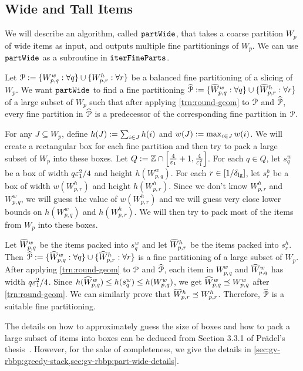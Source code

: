 \subsection{Wide and Tall Items}

We will describe an algorithm, called $\operatorname{\mathtt{partWide}}$,
that takes a coarse partition $W_p$ of wide items as input,
and outputs multiple fine partitionings of $W_p$.
We can use $\operatorname{\mathtt{partWide}}$ as a subroutine in $\operatorname{\mathtt{iterFineParts}}$.

Let $\mathcal{P} := \{W_{p,q}^w: \forall q\} \cup \{W_{p,r}^h: \forall r\}$ be
a balanced fine partitioning of a slicing of $W_p$.
We want $\operatorname{\mathtt{partWide}}$ to find a fine partitioning
$\widehat{\mathcal{P}} := \{\widehat{W}_{p,q}^w: \forall q\} \cup \{\widehat{W}_{p,r}^h: \forall r\}$
of a large subset of $W_p$ such that
after applying \cref{trn:round-geom} to $\mathcal{P}$ and $\widehat{\mathcal{P}}$,
every fine partition in $\widehat{\mathcal{P}}$ is a predecessor of
the corresponding fine partition in $\mathcal{P}$.

For any $J \subseteq W_p$, define
$h(J) := \sum_{i \in J} h(i)$ and $w(J) := \max_{i \in J} w(i)$.
We will create a rectangular box for each fine partition
and then try to pack a large subset of $W_p$ into these boxes.
Let $Q := \mathbb{Z} \cap \left[\frac{4}{\varepsilon_1}+1, \frac{4}{\varepsilon_1^2}\right]$.
For each $q \in Q$, let $s^w_q$ be a box
of width $q\varepsilon_1^2/4$ and height $h(W^w_{p,q})$.
For each $r \in [1/\delta_{\mathrm{lg}}]$, let $s^h_r$ be a box
of width $w(W^h_{p,r})$ and height $h(W^h_{p,r})$.
Since we don't know $W^h_{p,r}$ and $W^w_{p,q}$,
we will guess the value of $w(W^h_{p,r})$ and
we will guess very close lower bounds on $h(W^w_{p,q})$ and $h(W^h_{p,r})$.
We will then try to pack most of the items from $W_p$ into these boxes.

Let $\widehat{W}^w_{p,q}$ be the items packed into $s^w_q$ and
let $\widehat{W}^h_{p,r}$ be the items packed into $s^h_r$.
Then $\widehat{\mathcal{P}} := \{\widehat{W}_{p,q}^w: \forall q\} \cup \{\widehat{W}_{p,r}^h: \forall r\}$
is a fine partitioning of a large subset of $W_p$.
After applying \cref{trn:round-geom} to $\mathcal{P}$ and $\widehat{\mathcal{P}}$,
each item in $W^w_{p,q}$ and $\widehat{W}^w_{p,q}$ has width $q\varepsilon_1^2/4$.
Since $h(\widehat{W}^w_{p,q}) \le h(s^w_q) \le h(W^w_{p,q})$,
we get $\widehat{W}^w_{p,q} \preceq W^w_{p,q}$ after \cref{trn:round-geom}.
We can similarly prove that $\widehat{W}^h_{p,r} \preceq W^h_{p,r}$.
Therefore, $\widehat{\mathcal{P}}$ is a suitable fine partitioning.

The details on how to approximately guess the size of boxes
and how to pack a large subset of items into boxes can be deduced from
Section 3.3.1 of Pr\"adel's thesis~\cite{pradel-thesis}.
However, for the sake of completeness, we give the details
in \cref{sec:gv-rbbp:greedy-stack,sec:gv-rbbp:part-wide-details}.

